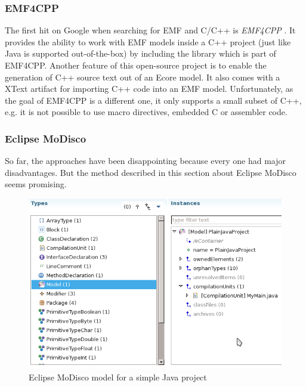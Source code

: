 \subsubsection{EMF4CPP}
The first hit on Google when searching for EMF and C/C++ is 
{\it EMF4CPP}
\cite{EMF4CPP} 
\cite{senac2010emf4cpp}. 
It provides the ability to work with EMF models inside a 
C++ project
(just like Java is supported out-of-the-box) by including the 
library which is part of EMF4CPP.
Another feature of this open-source project is to enable the 
generation of C++ source text out of an Ecore model.
It also comes with a XText artifact for importing C++ code 
into an EMF model.
Unfortunately, as the goal of EMF4CPP is a different one,
it only supports a small subset of C++, 
e.g. it is not possible to 
use macro directives, embedded C or assembler code.

\subsubsection{Eclipse MoDisco}
So far, the approaches have been disappointing because
every one had major disadvantages. But the method described
in this section about Eclipse MoDisco seems promising.

\begin{figure}[ht]
    \centering
	\includegraphics[scale=0.5]{images/JavaAST-2}
	\caption{Eclipse MoDisco model for a simple Java project}
    \label{fig:JavaAST2}
\end{figure}

